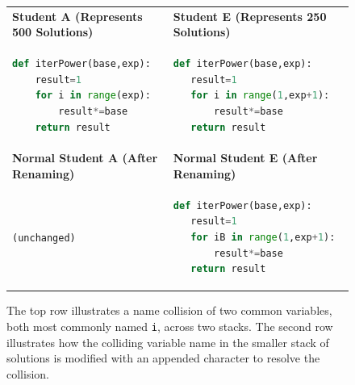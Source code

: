\documentclass[12pt,twoside]{mitthesis}
\newcommand \codevar[1]{\texttt{#1}}
\begin{document}
\begin{figure}
\begin{tabular}{l|l}

{\bf Student A (Represents 500 Solutions)} & {\bf Student E (Represents 250 Solutions)} \\
\begin{minipage}{0.5\linewidth}
\begin{lstlisting}[basicstyle=\linespread{1.0}\ttfamily\footnotesize,language=python]
def iterPower(base,exp):
    result=1
    for i in range(exp):
        result*=base
    return result
\end{lstlisting}
\end{minipage}
&
\begin{minipage}{0.5\linewidth}
\begin{lstlisting}[basicstyle=\linespread{1.0}\ttfamily\footnotesize,language=python,linebackgroundcolor={\lstcolorlines[gray!20]{3}}]
def iterPower(base,exp):
   result=1
   for i in range(1,exp+1):
       result*=base
   return result
\end{lstlisting}
\end{minipage}
\\
{\bf Normal Student A (After Renaming)} & {\bf Normal Student E (After Renaming)} \\
\codevar{(unchanged)} 
&
\begin{minipage}{0.5\linewidth}
\begin{lstlisting}[basicstyle=\linespread{1.0}\ttfamily\footnotesize,language=python,linebackgroundcolor={\lstcolorlines[gray!20]{3}}]
def iterPower(base,exp):
   result=1
   for iB in range(1,exp+1):
       result*=base
   return result
\end{lstlisting}
\end{minipage}
\end{tabular}
\caption{The top row illustrates a name collision of two common variables, both most commonly named \texttt{i}, across two stacks. The second row illustrates how the colliding variable name in the smaller stack of solutions is modified with an appended character to resolve the collision.}
\label{fig:commcommcoll}
\end{figure}
\end{document}
